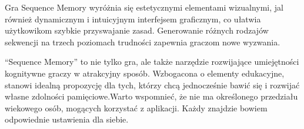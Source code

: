 \documentclass[]{report}
\begin{document}
	Gra Sequence Memory wyróżnia się estetycznymi elementami wizualnymi, jal również dynamicznym i intuicyjnym interfejsem graficznym, co ułatwia użytkowikom szybkie przyswajanie zasad. Generowanie różnych rodzajów sekwencji na trzech poziomach trudności zapewnia graczom nowe wyzwania.
	
	\enquote{Sequence Memory} to nie tylko gra, ale także narzędzie rozwijające umiejętności kognitywne graczy w atrakcyjny sposób. Wzbogacona o elementy edukacyjne, stanowi idealną propozycję dla tych, którzy chcą jednocześnie bawić się i rozwijać własne zdolności pamięciowe.Warto wspomnieć, że nie ma określonego przedziału wiekowego osób, mogących korzystać z aplikacji. Każdy znajdzie bowiem odpowiednie ustawienia dla siebie.
\end{document}
